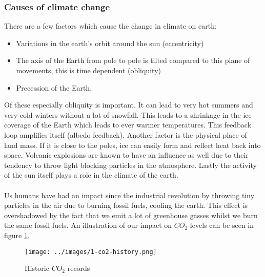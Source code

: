 \documentclass[../summary.tex]{subfiles}
\begin{document}
			\subsubsection{Causes of climate change}
				There are a few factors which cause the change in climate on earth:
				\begin{itemize}
					\item Variations in the earth's orbit around the sun (eccentricity)
					\item The axis of the Earth from pole to pole is tilted compared to this plane of movements, this is time dependent (obliquity)
					\item Precession of the Earth. 
				\end{itemize}
				Of these especially obliquity is important. It can lead to very hot summers and very cold winters without a lot of snowfall. This leads to a shrinkage in the ice coverage of the Earth which leads to ever warmer temperatures. This feedback loop amplifies itself (albedo feedback). Another factor is the physical place of land mass. If it is close to the poles, ice can easily form and reflect heat back into space. Volcanic explosions are known to have an influence as well due to their tendency to throw light blocking particles in the atmosphere. Lastly the activity of the sun itself plays a role in the climate of the earth. 
				\\\\
				Us humans have had an impact since the industrial revolution by throwing tiny particles in the air due to burning fossil fuels, cooling the earth. This effect is overshadowed by the fact that we emit a lot of greenhouse gasses whilst we burn the same fossil fuels. An illustration of our impact on $CO_2$ levels can be seen in figure \ref{fig:1-co2-history}.
				\begin{figure}[h]
					\centering
					\texttt{[image: ../images/1-co2-history.png]}
					\caption{Historic $CO_2$ records}
					\label{fig:1-co2-history}
				\end{figure}
				
			\newpage
\end{document}
